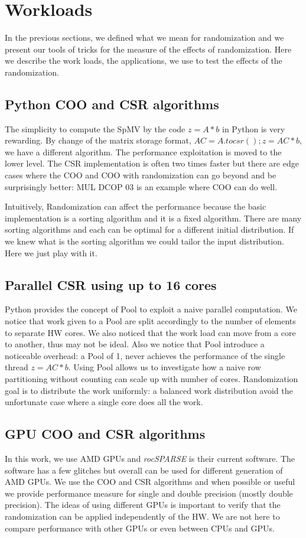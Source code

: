 \documentclass[manuscript,screen]{acmart}
\begin{document}
\section{Workloads}
\label{sec:workload}

In the previous sections, we defined what we mean for randomization
and we present our tools of tricks for the measure of the effects of
randomization. Here we describe the work loads, the applications, we
use to test the effects of the randomization.

\subsection{Python COO and CSR algorithms}
\label{sec:pythoncoocsr}
The simplicity to compute the SpMV by the code $z = A*b$ in Python is
very rewarding. By change of the matrix storage format, $AC =
A.tocsr(); z = AC*b$, we have a different algorithm. The performance
exploitation is moved to the lower level.  The CSR implementation is
often two times faster but there are edge cases where the COO and COO
with randomization can go beyond and be surprisingly better: MUL DCOP
03 is an example where COO can do well.

Intuitively, Randomization can affect the performance because the
basic implementation is a sorting algorithm and it is a fixed
algorithm. There are many sorting algorithms and each can be optimal
for a different initial distribution. If we knew what is the sorting
algorithm we could tailor the input distribution. Here we just play
with it.

\subsection{Parallel CSR using up to 16 cores}
\label{sec:parcpu}
Python provides the concept of Pool to exploit a naive parallel
computation. We notice that work given to a Pool are split accordingly
to the number of elements to separate HW cores. We also noticed that
the work load can move from a core to another, thus may not be
ideal. Also we notice that Pool introduce a noticeable overhead: a
Pool of 1, never achieves the performance of the single thread $z =
AC*b$. Using Pool allows us to investigate how a naive row
partitioning without counting can scale up with number of
cores. Randomization goal is to distribute the work uniformly: a
balanced work distribution avoid the unfortunate case where a single
core does all the work.


\subsection{GPU COO and CSR algorithms}
\label{sec:gpucoocsr}
In this work, we use AMD GPUs and {\em rocSPARSE} is their current
software. The software has a few glitches but overall can be used for
different generation of AMD GPUs. We use the COO and CSR algorithms
and when possible or useful we provide performance measure for single
and double precision (mostly double precision). The ideas of using
different GPUs is important to verify that the randomization can be
applied independently of the HW. We are not here to compare
performance with other GPUs or even between CPUs and GPUs.
\end{document}
